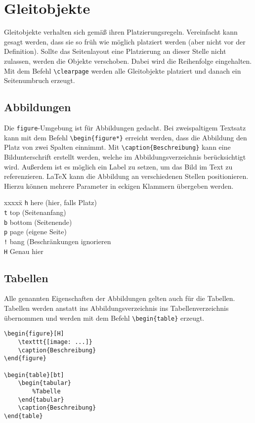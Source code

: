 \chapter{Gleitobjekte}
Gleitobjekte verhalten sich gemäß ihren Platzierungsregeln. Vereinfacht kann gesagt werden, dass sie so früh wie möglich platziert werden (aber nicht vor der Definition). Sollte das Seitenlayout eine Platzierung an dieser Stelle nicht zulassen, werden die Objekte verschoben. Dabei wird die Reihenfolge eingehalten. Mit dem Befehl \verb=\clearpage= werden alle Gleitobjekte platziert und danach ein Seitenumbruch erzeugt.
\section{Abbildungen}
Die \verb=figure=-Umgebung ist für Abbildungen gedacht. Bei zweispaltigem Textsatz kann mit dem Befehl \verb=\begin{figure*}= erreicht werden, dass die Abbildung den Platz von zwei Spalten einnimmt. Mit \verb=\caption{Beschreibung}= kann eine Bildunterschrift erstellt werden, welche im Abbildungsverzeichnis berücksichtigt wird. Außerdem ist es möglich ein Label zu setzen, um das Bild im Text zu referenzieren. \LaTeX{} kann die Abbildung an verschiedenen Stellen positionieren. Hierzu können mehrere Parameter in eckigen Klammern übergeben werden.
\begin{tabbing}
xxxxx\=\kill
\texttt{h}		\>here (hier, falls Platz)\\
\texttt{t}		\>top (Seitenanfang)\\
\texttt{b}		\>bottom (Seitenende)\\
\texttt{p}		\>page (eigene Seite)\\
\texttt{!}		\>bang (Beschränkungen ignorieren\\
\texttt{H}		\>Genau hier\\
\end{tabbing}
\section{Tabellen}
Alle genannten Eigenschaften der Abbildungen gelten auch für die Tabellen. Tabellen werden anstatt ins Abbildungsverzeichnis ins Tabellenverzeichnis übernommen und werden mit dem Befehl \verb=\begin{table}= erzeugt.\\
\begin{minipage}{1\textwidth}
\begin{lstlisting}[caption={Beispiele Abbildung \& Tabelle}]
\begin{figure}[H]
	\texttt{[image: ...]}
	\caption{Beschreibung}
\end{figure}

\begin{table}[bt]
	\begin{tabular}
		%Tabelle
	\end{tabular}
	\caption{Beschreibung}
\end{table}
\end{lstlisting}
\end{minipage}
